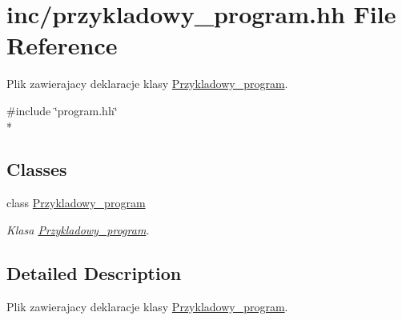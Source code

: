 \hypertarget{przykladowy__program_8hh}{\section{inc/przykladowy\-\_\-program.hh File Reference}
\label{przykladowy__program_8hh}
}


Plik zawierajacy deklaracje klasy \hyperlink{class_przykladowy__program}{Przykladowy\-\_\-program}.  


{\ttfamily \#include \char`\"{}program.\-hh\char`\"{}}\\*
\subsection*{Classes}
\begin{DoxyCompactItemize}
\item 
class \hyperlink{class_przykladowy__program}{Przykladowy\-\_\-program}
\begin{DoxyCompactList}\small\item\em Klasa \hyperlink{class_przykladowy__program}{Przykladowy\-\_\-program}. \end{DoxyCompactList}\end{DoxyCompactItemize}


\subsection{Detailed Description}
Plik zawierajacy deklaracje klasy \hyperlink{class_przykladowy__program}{Przykladowy\-\_\-program}. 